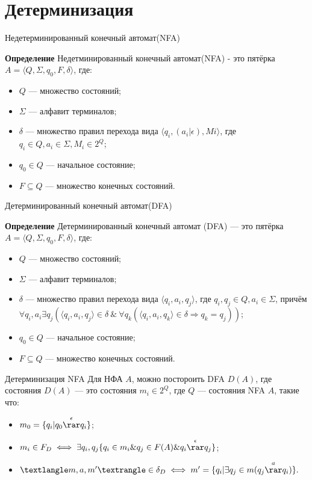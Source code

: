 \section{Детерминизация}
\begin{frame}{Недетерминированный конечный автомат(NFA)}
    \vspace{-5pt}
    \begin{block}{\bf Определение}
    Недетминированный конечный автомат(NFA) - это пятёрка $A = ⟨Q, \Sigma, q_0, F, \delta⟩$, где:
    \begin{itemize}
        \item $Q$ — множество состояний;
        \item $\Sigma$ — алфавит терминалов;
        \item $\delta$ — множество правил перехода вида $⟨q_i,(a_i|\epsilon),Mi⟩$, где $q_i \in Q, a_i \in \Sigma, M_i \in 2^Q$;
        \item $q_0 \in Q$ — начальное состояние;
        \item $F \subseteq Q$ — множество конечных состояний.
    \end{itemize}
    \end{block}
\end{frame}
\begin{frame}{Детерминированный конечный автомат(DFA)}
    \vspace{-5pt}
    \begin{block}{\bf Определение}
    Детерминированный конечный автомат (DFA) — это пятёрка $A = ⟨Q, \Sigma, q_0, F, \delta⟩$, где:
    \begin{itemize}
        \item $Q$ — множество состояний;
        \item $\Sigma$ — алфавит терминалов;
        \item $\delta$ — множество правил перехода вида $⟨q_i, a_i, q_j⟩$, где $q_i, q_j \in Q, a_i \in \Sigma$, причём $\forall q_i, a_i \exists q_j (⟨q_i, a_i, q_j⟩ \in \delta \: \& \: \forall q_k (⟨q_i, a_i, q_k⟩ \in \delta \Rightarrow q_k = q_j))$;
        \item $q_0 \in Q$ — начальное состояние;
        \item $F \subseteq Q$ — множество конечных состояний.
    \end{itemize}
    \end{block}
\end{frame}
\begin{frame}{Детерминизация NFA}
    \vspace{-5pt}
    Для НФА $A$, можно постороить DFA $D(A)$, где состояния $D(A)$ — это состояния $m_i \in 2^Q$, где $Q$ — состояния NFA $A$, такие что:
    \begin{itemize}
        \item $m_0 = \{q_i | {q_0}\overset{\epsilon}{\rar}{q_i}\}$;
        \item $m_i \in F_D \iff \exists q_i, q_j\{q_i \in m_i \& q_j\in F(A) \& {q_i}\overset{\epsilon}{\rar}{q_j}\}$;
        \item $⟨m, a, m'⟩ \in \delta_D \iff m' = \{q_i | \exists q_j \in m({q_j}\overset{a}{\rar}{q_i})\}.$
	
    \end{itemize}
\end{frame}
